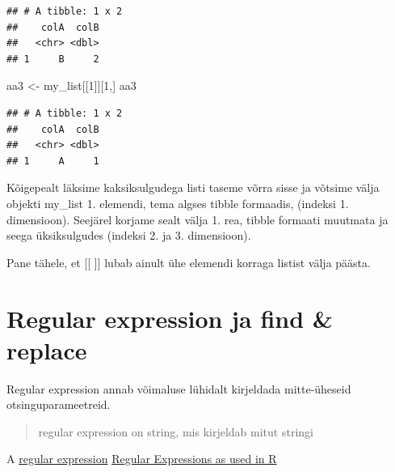 \documentclass[]{book}
\newenvironment{Shaded}{\begin{snugshade}}{\end{snugshade}}
\newcommand{\DecValTok}[1]{\textcolor[rgb]{0.00,0.00,0.81}{#1}}
\newcommand{\StringTok}[1]{\textcolor[rgb]{0.31,0.60,0.02}{#1}}
\newcommand{\NormalTok}[1]{#1}
\begin{document}
\begin{verbatim}
## # A tibble: 1 x 2
##    colA  colB
##   <chr> <dbl>
## 1     B     2
\end{verbatim}

\begin{Shaded}
\begin{Highlighting}[]
\NormalTok{aa3 <-}\StringTok{ }\NormalTok{my_list[[}\DecValTok{1}\NormalTok{]][}\DecValTok{1}\NormalTok{,]}
\NormalTok{aa3}
\end{Highlighting}
\end{Shaded}

\begin{verbatim}
## # A tibble: 1 x 2
##    colA  colB
##   <chr> <dbl>
## 1     A     1
\end{verbatim}

Kõigepealt läksime kaksiksulgudega listi taseme võrra sisse ja võtsime
välja objekti my\_list 1. elemendi, tema algses tibble formaadis,
(indeksi 1. dimensioon). Seejärel korjame sealt välja 1. rea, tibble
formaati muutmata ja seega üksiksulgudes (indeksi 2. ja 3. dimensioon).

Pane tähele, et {[}{[} {]}{]} lubab ainult ühe elemendi korraga listist
välja päästa.

\section{Regular expression ja find \&
replace}\label{regular-expression-ja-find-replace}

Regular expression annab võimaluse lühidalt kirjeldada mitte-üheseid
otsinguparameetreid.

\begin{quote}
regular expression on string, mis kirjeldab mitut stringi
\end{quote}

A
\href{https://stat.ethz.ch/R-manual/R-devel/library/base/html/regex.html}{regular
expression}
\href{https://stat.ethz.ch/R-manual/R-devel/library/base/html/regex.html}{Regular
Expressions as used in R}
\end{document}
